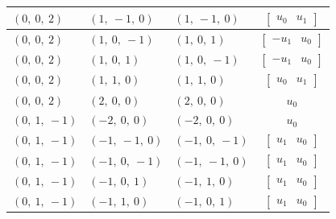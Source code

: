 \documentclass[11pt]{article}
\theoremstyle{definition}
\begin{document}
\begin{longtable}{|l|l|l|c|}
    \hline
    $\left( 0, \  0, \  2\right)$ & $\left( 1, \  -1, \  0\right)$ & $\left( 1, \  -1, \  0\right)$ & $\left[\begin{matrix}u_{0} & u_{1}\end{matrix}\right]$ \\
    \hline
    $\left( 0, \  0, \  2\right)$ & $\left( 1, \  0, \  -1\right)$ & $\left( 1, \  0, \  1\right)$ & $\left[\begin{matrix}- u_{1} & u_{0}\end{matrix}\right]$ \\
    \hline
    $\left( 0, \  0, \  2\right)$ & $\left( 1, \  0, \  1\right)$ & $\left( 1, \  0, \  -1\right)$ & $\left[\begin{matrix}- u_{1} & u_{0}\end{matrix}\right]$ \\
    \hline
    $\left( 0, \  0, \  2\right)$ & $\left( 1, \  1, \  0\right)$ & $\left( 1, \  1, \  0\right)$ & $\left[\begin{matrix}u_{0} & u_{1}\end{matrix}\right]$ \\
    \hline
    $\left( 0, \  0, \  2\right)$ & $\left( 2, \  0, \  0\right)$ & $\left( 2, \  0, \  0\right)$ & $u_{0}$ \\
    \hline
    $\left( 0, \  1, \  -1\right)$ & $\left( -2, \  0, \  0\right)$ & $\left( -2, \  0, \  0\right)$ & $u_{0}$ \\
    \hline
    $\left( 0, \  1, \  -1\right)$ & $\left( -1, \  -1, \  0\right)$ & $\left( -1, \  0, \  -1\right)$ & $\left[\begin{matrix}u_{1} & u_{0}\end{matrix}\right]$ \\
    \hline
    $\left( 0, \  1, \  -1\right)$ & $\left( -1, \  0, \  -1\right)$ & $\left( -1, \  -1, \  0\right)$ & $\left[\begin{matrix}u_{1} & u_{0}\end{matrix}\right]$ \\
    \hline
    $\left( 0, \  1, \  -1\right)$ & $\left( -1, \  0, \  1\right)$ & $\left( -1, \  1, \  0\right)$ & $\left[\begin{matrix}u_{1} & u_{0}\end{matrix}\right]$ \\
    \hline
    $\left( 0, \  1, \  -1\right)$ & $\left( -1, \  1, \  0\right)$ & $\left( -1, \  0, \  1\right)$ & $\left[\begin{matrix}u_{1} & u_{0}\end{matrix}\right]$ \\

\end{longtable}
\end{document}
